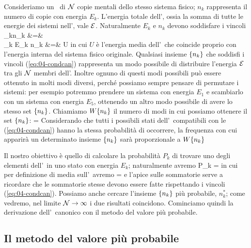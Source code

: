 Consideriamo un \ensemble\ di ${\mathcal N}$ copie mentali dello stesso sistema fisico; $n_k$ rappresenta il numero di copie con energia $E_k$. L'energia totale dell'\ensemble, ossia la somma di tutte le energie dei sistemi nell'\ensemble, vale ${\mathcal E}$. Naturalmente $E_k$ e $n_k$ devono soddisfare i vincoli
\bea
\label{eq:04-condcan}
\sum_{k}n_k      &=& \calN\nonumber\\
\sum_{k} E_k n_k &=& \calE \equiv U\calN
\eea
in cui $U$ è l'energia media dell'\ensemble\ che coincide proprio con l'energia interna del sistema fisico originale. 
Qualsiasi insieme $\{n_k\}$ che soddisfi i vincoli (\ref{eq:04-condcan}) rappresenta un modo possibile di distribuire l'energia ${\mathcal E}$ tra gli ${\mathcal N}$ membri dell'\ensemble. Inoltre ognuno di questi modi possibili può essere ottenuto in molti modi diversi, perché possiamo sempre pensare di permutare i sistemi: per esempio potremmo prendere un sistema con energia $E_1$ e scambiarlo con un sistema con energia $E_5$, ottenendo un altro modo possibile di avere lo stesso set $\{n_k\}$. Chiamiamo $W\{n_k\}$ il numero di modi in cui possiamo ottenere il set $\{n_k\}$:
\be
\label{eq:04-W}
\Wnk = 
\ee
Considerando che tutti i possibili stati dell'\ensemble\ compatibili con le (\ref{eq:04-condcan}) hanno la stessa probabilità di occorrere, la frequenza con cui apparirà un determinato insieme 
$\{n_k\}$ sarà proporzionale a $W\{n_k\}$

Il nostro obiettivo è quello di calcolare la probabilità $P_k$ di trovare uno degli elementi dell'\ensemble\ in uno stato con energia $E_k$; naturalmente avremo
\be
P_k = 
\ee
in cui per definizione di media sull'\ensemble\ avremo
\be
\label{eq:04-nrmean}
 = 
\ee
e l'apice sulle sommatorie serve a ricordare che le sommatorie stesse devono essere fatte rispettando i vincoli (\ref{eq:04-condcan}). Possiamo anche cercare l'insieme $\{n_k\}$ più probabile, $n_k^*$; come vedremo, nel limite ${\mathcal N}\to\infty$ i due risultati coincidono. Cominciamo quindi la derivazione dell'\ensemble\ canonico con il metodo del valore più probabile.

\subsection{Il metodo del valore più probabile}

